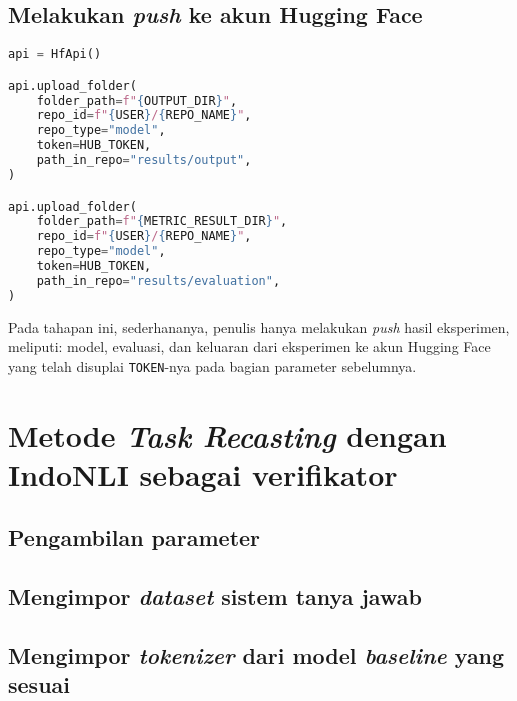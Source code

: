 \subsection{Melakukan \emph{push} ke akun Hugging Face}
\begin{lstlisting}[language=Python, caption=Melakukan \emph{push} ke akun Hugging Face]
api = HfApi()

api.upload_folder(
    folder_path=f"{OUTPUT_DIR}",
    repo_id=f"{USER}/{REPO_NAME}",
    repo_type="model",
    token=HUB_TOKEN,
    path_in_repo="results/output",
)

api.upload_folder(
    folder_path=f"{METRIC_RESULT_DIR}",
    repo_id=f"{USER}/{REPO_NAME}",
    repo_type="model",
    token=HUB_TOKEN,
    path_in_repo="results/evaluation",
)
\end{lstlisting}

Pada tahapan ini, sederhananya, penulis hanya melakukan \emph{push} hasil eksperimen, meliputi: model, evaluasi, dan keluaran dari eksperimen ke akun Hugging Face yang telah disuplai \texttt{TOKEN}-nya pada bagian parameter sebelumnya.

\section{Metode \emph{Task Recasting} dengan IndoNLI sebagai verifikator}
\subsection{Pengambilan parameter}

\subsection{Mengimpor \emph{dataset} sistem tanya jawab}

\subsection{Mengimpor \emph{tokenizer} dari model \emph{baseline} yang sesuai}

